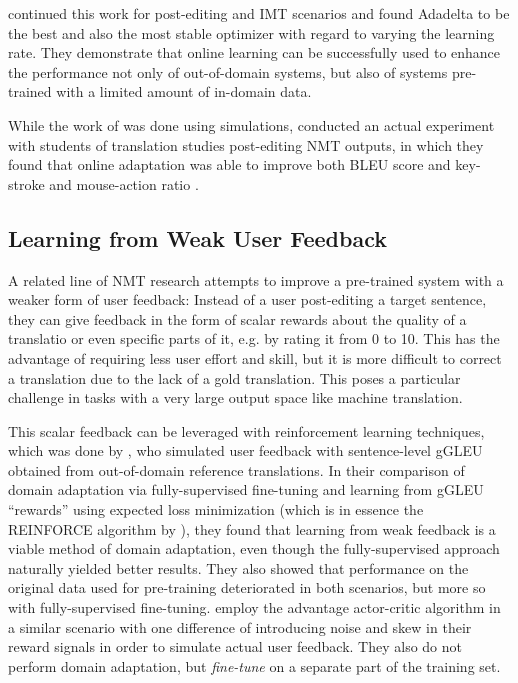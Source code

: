 \textcite{peris-2019} continued this work for post-editing and IMT scenarios and
found Adadelta to be the best and also the most stable optimizer with regard to
varying the learning rate. They demonstrate that online learning can be
successfully used to enhance the performance not only of out-of-domain systems,
but also of systems pre-trained with a limited amount of in-domain data.

While the work of \textcites{turchi-2017}{peris-2017}{peris-2019} was done using
simulations, \textcite{karimova-2018} conducted an actual experiment with
students of translation studies post-editing NMT outputs, in which they found
that online adaptation was able to improve both BLEU score and key-stroke and
mouse-action ratio \parencite[for KSMR cf.][]{barrachina-2009}.

\subsection{Learning from Weak User Feedback}

A related line of NMT research attempts to improve a pre-trained system with a
weaker form of user feedback: Instead of a user post-editing a target sentence,
they can give feedback in the form of scalar rewards about the quality of a
translatio or even specific parts of it, e.g. by rating it from 0 to 10. This
has the advantage of requiring less user effort and skill, but it is more
difficult to correct a translation due to the lack of a gold translation.
This poses a particular challenge in tasks with a very large output space like
machine translation.

This scalar feedback can be leveraged with reinforcement learning techniques,
which was done by \textcite{kreutzer-2017}, who simulated user feedback with
sentence-level gGLEU \parencite{wu-2016} obtained from out-of-domain reference
translations. In their comparison of domain adaptation via fully-supervised
fine-tuning and learning from gGLEU \enquote{rewards} using expected loss
minimization (which is in essence the REINFORCE algorithm by
\textcite{williams-1992}), they found that learning from weak feedback is a
viable method of domain adaptation, even though the fully-supervised approach
naturally yielded better results. They also showed that performance on the
original data used for pre-training deteriorated in both scenarios, but more so
with fully-supervised fine-tuning. \textcite{nguyen-2017} employ the advantage
actor-critic algorithm \parencite{mnih-2016} in a similar scenario with one
difference of introducing noise and skew in their reward signals in order to
simulate actual user feedback. They also do not perform domain adaptation, but
\emph{fine-tune} on a separate part of the training set.

